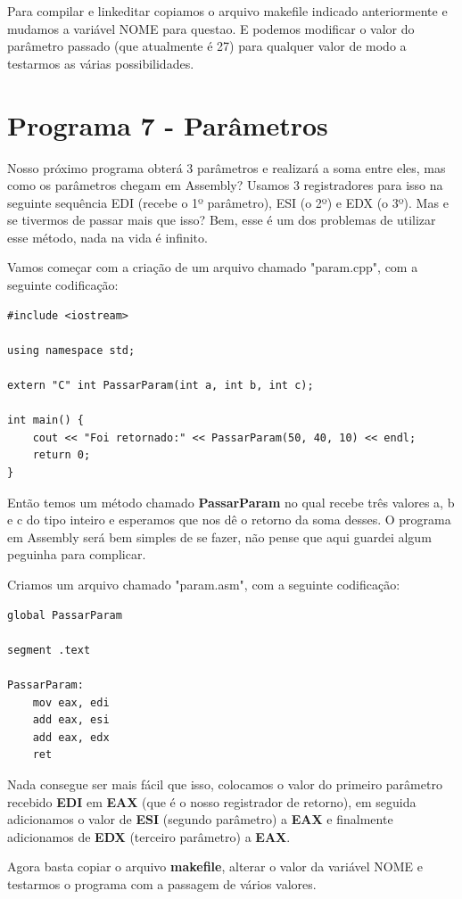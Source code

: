 Para compilar e linkeditar copiamos o arquivo makefile indicado anteriormente e mudamos a variável NOME para questao. E podemos modificar o valor do parâmetro passado (que atualmente é 27) para qualquer valor de modo a testarmos as várias possibilidades.

\section{Programa 7 - Parâmetros}
Nosso próximo programa obterá 3 parâmetros e realizará a soma entre eles, mas como os parâmetros chegam em Assembly? Usamos 3 registradores para isso na seguinte sequência EDI (recebe o 1º parâmetro), ESI (o 2º) e EDX (o 3º). Mas e se tivermos de passar mais que isso? Bem, esse é um dos problemas de utilizar esse método, nada na vida é infinito.

Vamos começar com a criação de um arquivo chamado "param.cpp", com a seguinte codificação:
\begin{lstlisting}[]
#include <iostream>

using namespace std;

extern "C" int PassarParam(int a, int b, int c);

int main() {
	cout << "Foi retornado:" << PassarParam(50, 40, 10) << endl;
	return 0;
}
\end{lstlisting}

Então temos um método chamado \textbf{PassarParam} no qual recebe três valores a, b e c do tipo inteiro e esperamos que nos dê o retorno da soma desses. O programa em Assembly será bem simples de se fazer, não pense que aqui guardei algum peguinha para complicar.

Criamos um arquivo chamado "param.asm", com a seguinte codificação:
\begin{lstlisting}[]
global PassarParam

segment .text

PassarParam:
	mov eax, edi
	add eax, esi
	add eax, edx
	ret
\end{lstlisting}

Nada consegue ser mais fácil que isso, colocamos o valor do primeiro parâmetro recebido \textbf{EDI} em \textbf{EAX} (que é o nosso registrador de retorno), em seguida adicionamos o valor de \textbf{ESI} (segundo parâmetro) a \textbf{EAX} e finalmente adicionamos de \textbf{EDX} (terceiro parâmetro) a \textbf{EAX}.

Agora basta copiar o arquivo \textbf{makefile}, alterar o valor da variável NOME e testarmos o programa com a passagem de vários valores.

